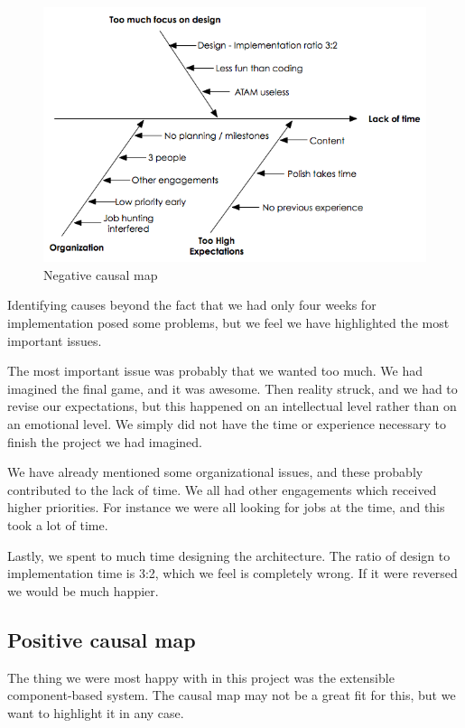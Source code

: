 \documentclass[titlepage,a4paper,11pt]{article}
\begin{document}
\begin{figure}
    \begin{center}
    \includegraphics[width=\linewidth]{graphics/negMap}
    \caption{Negative causal map}
    \label{fig:negmap}
    \end{center}
\end{figure}

Identifying causes beyond the fact that we had only four weeks for 
implementation posed some problems, but we feel we have highlighted the
most important issues.

The most important issue was probably that we wanted too much. We had 
imagined the final game, and it was awesome. Then reality struck, and we
had to revise our expectations, but this happened on an intellectual level
rather than on an emotional level. We simply did not have the time or 
experience necessary to finish the project we had imagined.

We have already mentioned some organizational issues, and these probably
contributed to the lack of time. We all had other engagements which
received higher priorities. For instance we were all looking for jobs at
the time, and this took a lot of time.

Lastly, we spent to much time designing the architecture. The ratio of
design to implementation time is 3:2, which we feel is completely wrong.
If it were reversed we would be much happier.

\subsection{Positive causal map}

The thing we were most happy with in this project was the extensible
component-based system.  The causal map may not be a great fit for this,
but we want to highlight it in any case.
\end{document}
